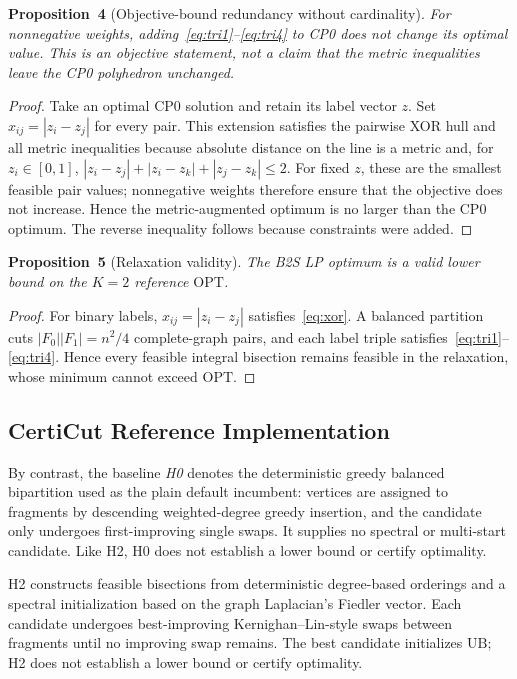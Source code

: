 \documentclass[11pt]{article}
\newcommand{\OPT}{\mathrm{OPT}}
\newcommand{\UB}{\mathrm{UB}}
\begin{document}
\textbf{Proposition~4} (Objective-bound redundancy without cardinality). \textit{For nonnegative weights, adding~\eqref{eq:tri1}--\eqref{eq:tri4} to CP0 does not change its optimal value. This is an objective statement, not a claim that the metric inequalities leave the CP0 polyhedron unchanged.}

\begin{proof} Take an optimal CP0 solution and retain its label vector $z$. Set $x_{ij}=|z_i-z_j|$ for every pair. This extension satisfies the pairwise XOR hull and all metric inequalities because absolute distance on the line is a metric and, for $z_i\in[0,1]$, $|z_i-z_j|+|z_i-z_k|+|z_j-z_k|\leq2$. For fixed $z$, these are the smallest feasible pair values; nonnegative weights therefore ensure that the objective does not increase. Hence the metric-augmented optimum is no larger than the CP0 optimum. The reverse inequality follows because constraints were added.\end{proof}

\textbf{Proposition~5} (Relaxation validity). \textit{The B2S LP optimum is a valid lower bound on the $K=2$ reference $\OPT$.}

\begin{proof} For binary labels, $x_{ij}=|z_i-z_j|$ satisfies~\eqref{eq:xor}. A balanced partition cuts $|F_0||F_1|=n^2/4$ complete-graph pairs, and each label triple satisfies~\eqref{eq:tri1}--\eqref{eq:tri4}. Hence every feasible integral bisection remains feasible in the relaxation, whose minimum cannot exceed $\OPT$.\end{proof}

\subsection{CertiCut Reference Implementation}

By contrast, the baseline \emph{H0} denotes the deterministic greedy balanced bipartition used as the plain default incumbent: vertices are assigned to fragments by descending weighted-degree greedy insertion, and the candidate only undergoes first-improving single swaps. It supplies no spectral or multi-start candidate. Like H2, H0 does not establish a lower bound or certify optimality.

H2 constructs feasible bisections from deterministic degree-based orderings and a spectral initialization based on the graph Laplacian's Fiedler vector. Each candidate undergoes best-improving Kernighan--Lin-style swaps between fragments until no improving swap remains. The best candidate initializes $\UB$; H2 does not establish a lower bound or certify optimality.
\end{document}
